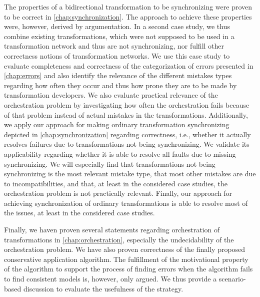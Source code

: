 The properties of a bidirectional transformation to be synchronizing were proven to be correct in \autoref{chap:synchronization}.
The approach to achieve these properties were, however, derived by argumentation.
In a second case study, we thus combine existing transformations, which were not supposed to be used in a transformation network and thus are not synchronizing, nor fulfill other correctness notions of transformation networks.
We use this case study to evaluate completeness and correctness of the categorization of errors presented in \autoref{chap:errors} and also identify the relevance of the different mistakes types regarding how often they occur and thus how prone they are to be made by transformation developers.
We also evaluate practical relevance of the orchestration problem by investigating how often the orchestration fails because of that problem instead of actual mistakes in the transformations.
Additionally, we apply our approach for making ordinary transformation synchronizing depicted in \autoref{chap:synchronization} regarding correctness, i.e., whether it actually resolves failures due to transformations not being synchronizing. %
We validate its applicability regarding whether it is able to resolve all faults due to missing synchronizing.
We will especially find that transformations not being synchronizing is the most relevant mistake type, that most other mistakes are due to incompatibilities, and that, at least in the considered case studies, the orchestration problem is not practically relevant.
Finally, our approach for achieving synchronization of ordinary transformations is able to resolve most of the issues, at least in the considered case studies.

Finally, we haven proven several statements regarding orchestration of transformations in \autoref{chap:orchestration}, especially the undecidability of the orchestration problem.
We have also proven correctness of the finally proposed conservative application algorithm.
The fulfillment of the motivational property of the algorithm to support the process of finding errors when the algorithm fails to find consistent models is, however, only argued.
We thus provide a scenario-based discussion to evaluate the usefulness of the strategy.

